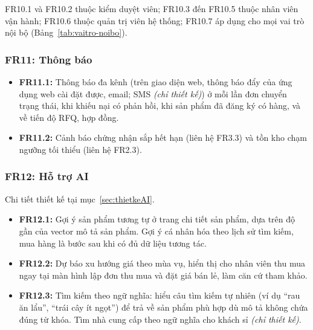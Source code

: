 \noindent FR10.1 và FR10.2 thuộc kiểm duyệt viên; FR10.3 đến FR10.5 thuộc
nhân viên vận hành; FR10.6 thuộc quản trị viên hệ thống; FR10.7 áp dụng cho
mọi vai trò nội bộ (Bảng~\ref{tab:vaitro-noibo}).

\subsubsection*{FR11: Thông báo}
\begin{itemize}
    \item \textbf{FR11.1:} Thông báo đa kênh (trên giao diện web, thông báo
    đẩy của ứng dụng web cài đặt được, email; SMS \emph{(chỉ thiết kế)}) ở mỗi lần đơn chuyển trạng
    thái, khi khiếu nại có phản hồi, khi sản phẩm đã đăng ký có hàng, và về
    tiến độ RFQ, hợp đồng.
    \item \textbf{FR11.2:} Cảnh báo chứng nhận sắp hết hạn (liên hệ FR3.3)
    và tồn kho chạm ngưỡng tối thiểu (liên hệ FR2.3).
\end{itemize}

\subsubsection*{FR12: Hỗ trợ AI}
\label{subsec:FR-AI}
Chi tiết thiết kế tại mục~\ref{sec:thietkeAI}.
\begin{itemize}
    \item \textbf{FR12.1:} Gợi ý sản phẩm tương tự ở trang chi tiết sản phẩm,
    dựa trên độ gần của vector mô tả sản phẩm. Gợi ý cá nhân hóa theo lịch sử
    tìm kiếm, mua hàng là bước sau khi có đủ dữ liệu tương tác.
    \item \textbf{FR12.2:} Dự báo xu hướng giá theo mùa vụ, hiển thị cho nhân
    viên thu mua ngay tại màn hình lập đơn thu mua và đặt giá bán lẻ, làm căn
    cứ tham khảo.
    \item \textbf{FR12.3:} Tìm kiếm theo ngữ nghĩa: hiểu câu tìm kiếm tự
    nhiên (ví dụ ``rau ăn lẩu'', ``trái cây ít ngọt'') để trả về sản phẩm phù
    hợp dù mô tả không chứa đúng từ khóa. Tìm nhà cung cấp theo ngữ nghĩa cho
    khách sỉ \emph{(chỉ thiết kế)}.
\end{itemize}

